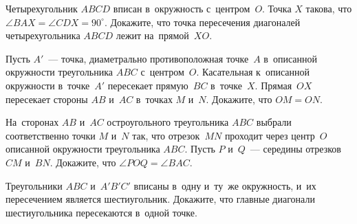 \begin{problems}
\item
Четырехугольник $ABCD$ вписан в~окружность с~центром~$O$.
Точка $X$ такова, что $\angle BAX = \angle CDX = 90^{\circ}$.
Докажите, что точка пересечения диагоналей четырехугольника $ABCD$ лежит
на~прямой~$XO$.

\item
Пусть $A'$~--- точка, диаметрально противоположная точке~$A$ в~описанной
окружности треугольника $ABC$ с~центром~$O$.
Касательная к~описанной окружности в~точке~$A'$ пересекает прямую~$BC$
в~точке~$X$.
Прямая~$OX$ пересекает стороны $AB$ и~$AC$ в~точках $M$ и~$N$.
Докажите, что $OM = ON$.

\item
На~сторонах $AB$ и~$AC$ остроугольного треугольника $ABC$ выбрали
соответственно точки $M$ и~$N$ так, что отрезок~$MN$ проходит через центр~$O$
описанной окружности треугольника $ABC$.
Пусть $P$ и~$Q$~--- середины отрезков $CM$ и~$BN$.
Докажите, что $\angle POQ = \angle BAC$.

\item
Треугольники $ABC$ и~$A'B'C'$ вписаны в~одну и~ту~же окружность, и~их
пересечением является шестиугольник.
Докажите, что главные диагонали шестиугольника пересекаются в~одной точке.




\end{problems}

